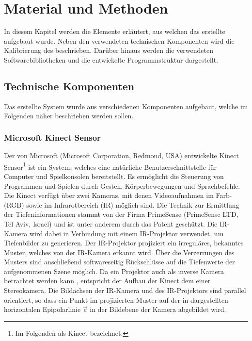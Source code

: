 \chapter{Material und Methoden}
\label{chap.material}
\prever{
}
In diesem Kapitel werden die Elemente erläutert, aus welchen das erstellte \kps{} aufgebaut wurde. Neben den verwendeten technischen Komponenten wird die Kalibrierung des  beschrieben. Darüber hinaus werden die verwendeten Softwarebibliotheken und die entwickelte Programmstruktur dargestellt.

\section{Technische Komponenten}
Das erstellte System wurde aus verschiedenen Komponenten aufgebaut, welche im Folgenden näher beschrieben werden sollen. 
\prever{
}
\subsection{Microsoft Kinect\textsuperscript{\texttrademark} Sensor}
\label{chap.kinect}
Der von Microsoft (Microsoft Corporation, Redmond, USA) entwickelte Kinect\textsuperscript{\texttrademark} Sensor\footnote{Im Folgenden als Kinect bezeichnet.} ist ein System, welches eine natürliche Benutzerschnittstelle für Computer und Spielkonsolen bereitstellt. Es ermöglicht die Steuerung von Programmen und Spielen durch Gesten, Körperbewegungen und Sprachbefehle. Die Kinect verfügt über zwei Kameras, mit denen Videoaufnahmen im Farb- (RGB) sowie im Infrarotbereich (IR) möglich sind. Die Technik zur Ermittlung der Tiefeninformationen stammt von der Firma PrimeSense (PrimeSense LTD, Tel Aviv, Israel) und ist unter anderem durch das Patent \cite{Freedman2008} geschützt. Die IR-Kamera wird dabei in Verbindung mit einem IR-Projektor verwendet, um Tiefenbilder zu generieren. Der IR-Projektor projiziert ein irreguläres, bekanntes Muster, welches von der IR-Kamera erkannt wird. Über die Verzerrungen des Musters sind anschließend softwareseitig Rückschlüsse auf die Tiefenwerte der aufgenommenen Szene möglich. Da ein Projektor auch als inverse Kamera betrachtet werden kann \cite{Kimura2007}, entspricht der Aufbau der Kinect dem einer Stereokamera. Die Bildachsen der IR-Kamera und des IR-Projektors sind parallel orientiert, so dass ein Punkt im projizierten Muster auf der in  dargestellten horizontalen Epipolarlinie $\vec{e}$ in der Bildebene der Kamera abgebildet wird.\\
\clearpage{}

